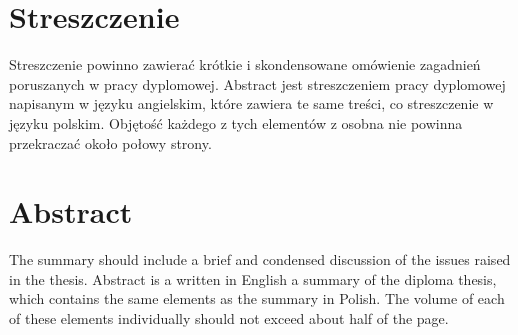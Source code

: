 \section*{Streszczenie}

Streszczenie powinno zawierać krótkie i skondensowane omówienie zagadnień poruszanych w pracy dyplomowej.
Abstract jest streszczeniem pracy dyplomowej napisanym w języku angielskim, które zawiera te same treści,
co streszczenie w języku polskim.
Objętość każdego z tych elementów z osobna nie powinna przekraczać około połowy strony.

\section*{Abstract}

The summary should include a brief and condensed discussion of the issues raised in the thesis.
Abstract is a written in English a summary of the diploma thesis,
which contains the same elements as the summary in Polish.
The volume of each of these elements individually should not exceed about half of the page.